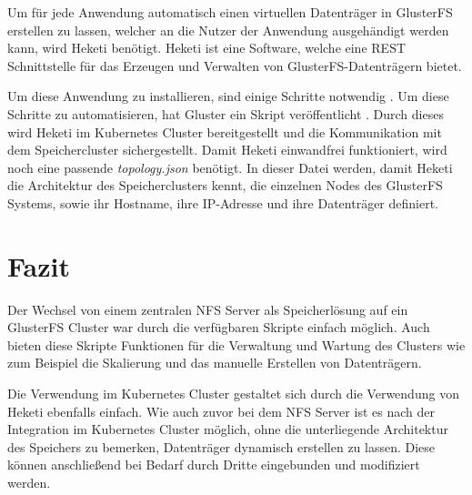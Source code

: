 Um für jede Anwendung automatisch einen virtuellen Datenträger in GlusterFS erstellen zu lassen, welcher an die Nutzer der Anwendung ausgehändigt werden kann, wird Heketi benötigt. Heketi ist eine Software, welche eine \ac{REST} Schnittstelle für das Erzeugen und Verwalten von GlusterFS-Datenträgern bietet. \medskip

Um diese Anwendung zu installieren, sind einige Schritte notwendig \cite{gluster:includekubernetesteps}. Um diese Schritte zu automatisieren, hat Gluster ein Skript veröffentlicht \cite{gluster:includekubernete}. Durch dieses wird Heketi im Kubernetes Cluster bereitgestellt und die Kommunikation mit dem Speichercluster sichergestellt. Damit Heketi einwandfrei funktioniert, wird noch eine passende \textit{topology.json} benötigt. In dieser Datei werden, damit Heketi die Architektur des Speicherclusters kennt, die einzelnen Nodes des GlusterFS Systems, sowie ihr Hostname, ihre IP-Adresse und ihre Datenträger definiert.

\section{Fazit}
Der Wechsel von einem zentralen NFS Server als Speicherlösung auf ein GlusterFS Cluster war durch die verfügbaren Skripte einfach möglich. Auch bieten diese Skripte Funktionen für die Verwaltung und Wartung des Clusters wie zum Beispiel die Skalierung und das manuelle Erstellen von Datenträgern. \medskip

Die Verwendung im Kubernetes Cluster gestaltet sich durch die Verwendung von Heketi ebenfalls einfach. Wie auch zuvor bei dem NFS Server ist es nach der Integration im Kubernetes Cluster möglich, ohne die unterliegende Architektur des Speichers zu bemerken, Datenträger dynamisch erstellen zu lassen. Diese können anschließend bei Bedarf durch Dritte eingebunden und modifiziert werden.
